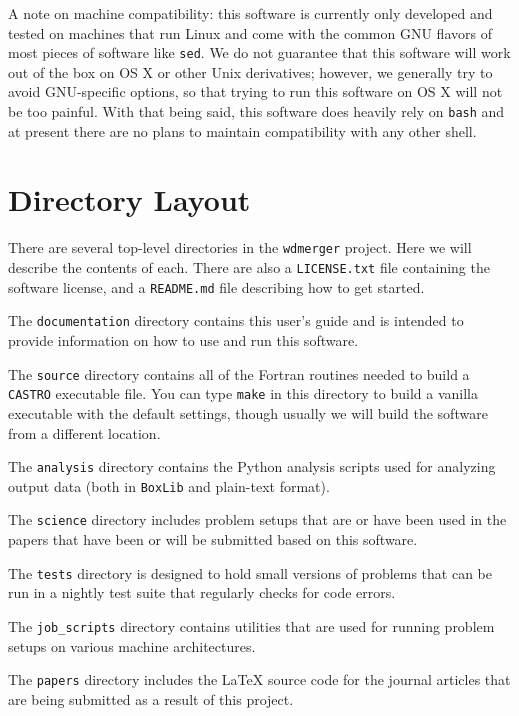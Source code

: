 \documentclass[12pt]{book}
\begin{document}
A note on machine compatibility: this software is currently only developed and tested on
machines that run Linux and come with the common GNU flavors of most pieces of software
like \texttt{sed}. We do not guarantee that this software will work out of the box on OS X
or other Unix derivatives; however, we generally try to avoid GNU-specific options, so that 
trying to run this software on OS X will not be too painful. With that being said, this 
software does heavily rely on \texttt{bash} and at present there are no plans to maintain
compatibility with any other shell.

\chapter{Directory Layout}

There are several top-level directories in the \texttt{wdmerger} project. Here we will describe
the contents of each. There are also a \texttt{LICENSE.txt} file containing the software license,
and a \texttt{README.md} file describing how to get started.

The \texttt{documentation} directory contains this user's guide and is intended to provide information
on how to use and run this software.

The \texttt{source} directory contains all of the Fortran routines needed to build a \texttt{CASTRO} 
executable file. You can type \texttt{make} in this directory to build a vanilla executable 
with the default settings, though usually we will build the software from a different location.

The \texttt{analysis} directory contains the Python analysis scripts used for analyzing output
data (both in \texttt{BoxLib} and plain-text format). 

The \texttt{science} directory includes problem setups that are or have been used in the papers
that have been or will be submitted based on this software.

The \texttt{tests} directory is designed to hold small versions of problems that can be run in a
nightly test suite that regularly checks for code errors.

The \texttt{job\_scripts} directory contains utilities that are used for running
problem setups on various machine architectures.

The \texttt{papers} directory includes the LaTeX source code for the journal articles
that are being submitted as a result of this project.
\end{document}
